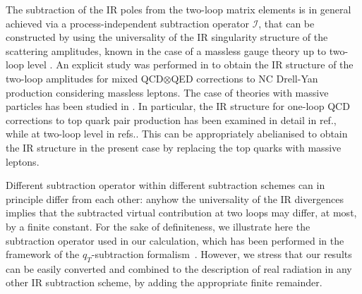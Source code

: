 \documentclass[11pt,a4paper]{article}
\begin{document}
The subtraction of the IR poles from the two-loop matrix elements is in general achieved via a process-independent subtraction operator $\mathcal{I}$,
that can be constructed by using the universality of the
IR singularity structure of the scattering amplitudes,
known in the case of a massless gauge theory up to two-loop level
\cite{Catani:1998bh,Sterman:2002qn,Becher:2009cu,Gardi:2009qi}.
%
An explicit study was performed in \cite{Kilgore:2011pa,Kilgore:2013uta}
to obtain the IR structure of the two-loop amplitudes
for mixed QCD$\otimes$QED corrections to NC Drell-Yan production
considering massless leptons.
%
The case of theories with massive particles  has been studied in
\cite{Mitov:2006xs,Becher:2007cu,Becher:2009kw,Ahmed:2017gyt,Blumlein:2018tmz}.
In particular, the IR structure for one-loop QCD corrections
to top quark pair production has been examined in detail in ref.\cite{Catani:2014qha}, while at two-loop level in refs.\cite{Catani:2019iny,Catani:2019hip,Catani:2020kkl}.
This can be appropriately abelianised \cite{Buonocore:2019puv} to obtain
the IR structure in the present case
by replacing the top quarks with massive leptons.

Different subtraction operator within different subtraction schemes can in principle differ from each other:
anyhow the universality of the IR divergences implies that the subtracted virtual contribution at two loops may differ, at most, by a finite constant.
For the sake of definiteness,
we illustrate here the subtraction operator used in our calculation, which has been performed
in the framework of the $q_T$-subtraction formalism~\cite{Catani:2007vq}.
However, we stress that our results can be easily converted and combined to the
description of real radiation in any other IR subtraction scheme,
by adding the appropriate finite remainder.
\end{document}
